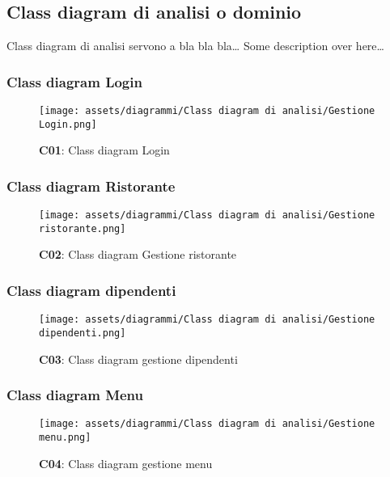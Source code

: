 \subsection{Class diagram di analisi o dominio}

    \begin{flushleft}
        Class diagram di analisi servono a bla bla bla\ldots
        Some description over here\ldots
    \end{flushleft}

    \subsubsection{Class diagram Login}
        \begin{figure}[H]
            \centering
            \texttt{[image: assets/diagrammi/Class diagram di analisi/Gestione Login.png]}
            \caption{\textbf{C01}: Class diagram Login}\label{fig:Login}
        \end{figure}

    \subsubsection{Class diagram Ristorante}
        \begin{figure}[H]
            \centering
            \texttt{[image: assets/diagrammi/Class diagram di analisi/Gestione ristorante.png]}
            \caption{\textbf{C02}: Class diagram Gestione ristorante}\label{fig:Ristorante}
        \end{figure}

    \subsubsection{Class diagram dipendenti}
        \begin{figure}[H]
            \centering
            \texttt{[image: assets/diagrammi/Class diagram di analisi/Gestione dipendenti.png]}
            \caption{\textbf{C03}: Class diagram gestione dipendenti}\label{fig:Dipendenti}
        \end{figure}
    
    \subsubsection{Class diagram Menu}
        \begin{figure}[H]
            \centering
            \texttt{[image: assets/diagrammi/Class diagram di analisi/Gestione menu.png]}
            \caption{\textbf{C04}: Class diagram gestione menu}\label{fig:Menu}
        \end{figure} 

